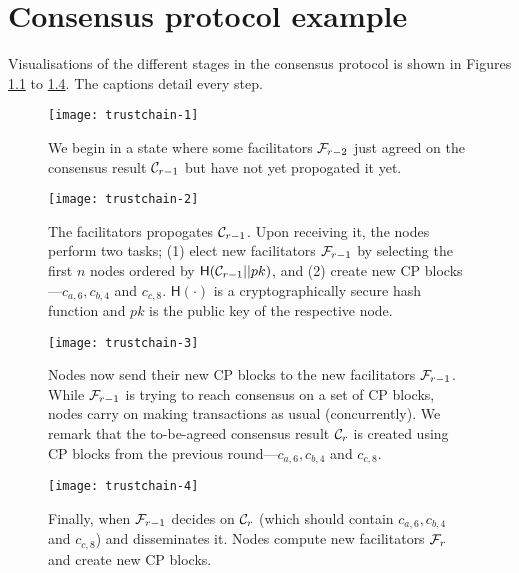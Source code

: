 \chapter{Consensus protocol example}
\label{app:consensus-example}

Visualisations of the different stages in the consensus protocol is shown in Figures \ref{fig:trustchain-1} to \ref{fig:trustchain-4}.
The captions detail every step.

\begin{figure}[htb]
    \texttt{[image: trustchain-1]}
    \centering
    \caption{We begin in a state where some facilitators $\mathcal{F}_{r-2}$ just agreed on the consensus result $\mathcal{C}_{r-1}$ but have not yet propogated it yet.}
    \label{fig:trustchain-1}
\end{figure}

\begin{figure}[htb]
    \texttt{[image: trustchain-2]}
    \centering
    \caption{The facilitators propogates $\mathcal{C}_{r-1}$. Upon receiving it, the nodes perform two tasks;
    (1) elect new facilitators $\mathcal{F}_{r-1}$ by selecting the first $n$ nodes ordered by $\textsf{H}(\mathcal{C}_{r-1} || pk)$,
    and (2) create new CP blocks---$c_{a, 6}, c_{b, 4}$ and $c_{c, 8}$.
    $\textsf{H}(\cdot)$ is a cryptographically secure hash function and $pk$ is the public key of the respective node.}
    \label{fig:trustchain-2}
\end{figure}

\begin{figure}
    \texttt{[image: trustchain-3]}
    \centering
    \caption{Nodes now send their new CP blocks to the new facilitators $\mathcal{F}_{r-1}$.
    While $\mathcal{F}_{r-1}$ is trying to reach consensus on a set of CP blocks,
    nodes carry on making transactions as usual (concurrently).
    We remark that the to-be-agreed consensus result $\mathcal{C}_r$ is created using CP blocks from the previous round---$c_{a, 6}, c_{b, 4}$ and $c_{c, 8}$.
    }
    \label{fig:trustchain-3}
\end{figure}

\begin{figure}
    \texttt{[image: trustchain-4]}
    \centering
    \caption{Finally, when $\mathcal{F}_{r-1}$ decides on $\mathcal{C}_r$ (which should contain $c_{a, 6}, c_{b, 4}$ and $c_{c, 8}$) and disseminates it.
    Nodes compute new facilitators $\mathcal{F}_{r}$ and create new CP blocks.}
    \label{fig:trustchain-4}
\end{figure}